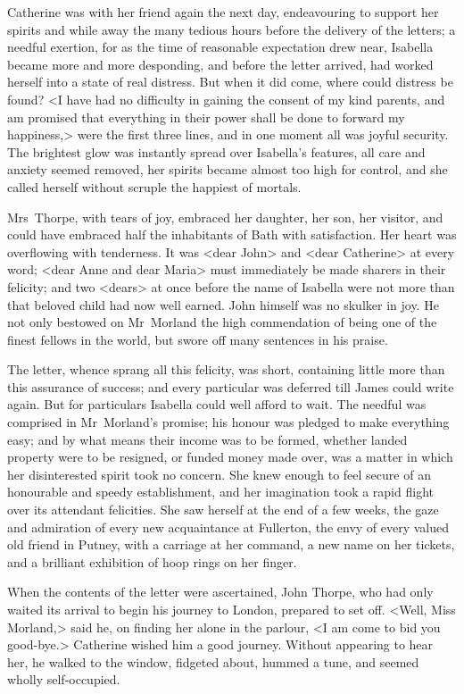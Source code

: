  Catherine was with her friend again the next day, endeavouring to support her spirits and while away the many tedious hours before the delivery of the letters; a needful exertion, for as the time of reasonable expectation drew near, Isabella became more and more desponding, and before the letter arrived, had worked herself into a state of real distress. But when it did come, where could distress be found? <I have had no difficulty in gaining the consent of my kind parents, and am promised that everything in their power shall be done to forward my happiness,> were the first three lines, and in one moment all was joyful security. The brightest glow was instantly spread over Isabella's features, all care and anxiety seemed removed, her spirits became almost too high for control, and she called herself without scruple the happiest of mortals. 

 Mrs~Thorpe, with tears of joy, embraced her daughter, her son, her visitor, and could have embraced half the inhabitants of Bath with satisfaction. Her heart was overflowing with tenderness. It was <dear John> and <dear Catherine> at every word; <dear Anne and dear Maria> must immediately be made sharers in their felicity; and two <dears> at once before the name of Isabella were not more than that beloved child had now well earned. John himself was no skulker in joy. He not only bestowed on Mr~Morland the high commendation of being one of the finest fellows in the world, but swore off many sentences in his praise. 

 The letter, whence sprang all this felicity, was short, containing little more than this assurance of success; and every particular was deferred till James could write again. But for particulars Isabella could well afford to wait. The needful was comprised in Mr~Morland's promise; his honour was pledged to make everything easy; and by what means their income was to be formed, whether landed property were to be resigned, or funded money made over, was a matter in which her disinterested spirit took no concern. She knew enough to feel secure of an honourable and speedy establishment, and her imagination took a rapid flight over its attendant felicities. She saw herself at the end of a few weeks, the gaze and admiration of every new acquaintance at Fullerton, the envy of every valued old friend in Putney, with a carriage at her command, a new name on her tickets, and a brilliant exhibition of hoop rings on her finger. 

 When the contents of the letter were ascertained, John Thorpe, who had only waited its arrival to begin his journey to London, prepared to set off. <Well, Miss Morland,> said he, on finding her alone in the parlour, <I am come to bid you good-bye.> Catherine wished him a good journey. Without appearing to hear her, he walked to the window, fidgeted about, hummed a tune, and seemed wholly self-occupied. 


